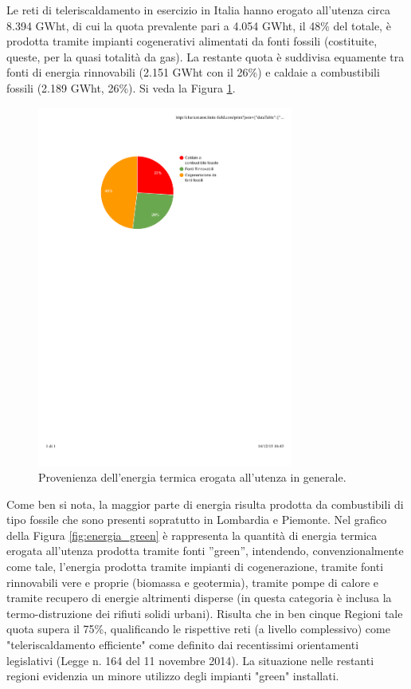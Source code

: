 \documentclass[laurea,oneside,11pt]{USiena_tesiLM}
\begin{document}
Le reti di teleriscaldamento in esercizio in Italia hanno erogato all'utenza circa 8.394 GWht, di cui la quota prevalente pari a 4.054 GWht, il 48\% del totale, è prodotta tramite impianti cogenerativi alimentati da fonti fossili (costituite, queste, per la quasi totalità da gas). La restante quota è suddivisa equamente tra fonti di energia rinnovabili (2.151 GWht con il 26\%) e caldaie a combustibili fossili (2.189 GWht, 26\%). Si veda la Figura \ref{fig:torta}.

\begin{figure}[!ht]
\centering
\includegraphics[width=0.75\textwidth]{figure/torta_energia} 
\caption{Provenienza dell'energia termica erogata all'utenza in generale.}
\label{fig:torta}
\end{figure}

Come ben si nota, la maggior parte di energia risulta prodotta da combustibili di tipo fossile che sono presenti sopratutto in Lombardia e Piemonte.
Nel grafico della Figura \ref{fig:energia_green} è rappresenta la quantità di energia termica erogata all'utenza prodotta tramite fonti ''green'', intendendo, convenzionalmente come tale, l'energia prodotta tramite impianti di cogenerazione, tramite fonti rinnovabili vere e proprie (biomassa e geotermia), tramite pompe di calore e tramite recupero di energie altrimenti disperse (in questa categoria è inclusa la termo-distruzione dei rifiuti solidi urbani).
Risulta che in ben cinque Regioni tale quota supera il 75\%, qualificando le rispettive reti (a livello complessivo) come "teleriscaldamento efficiente" come definito dai recentissimi orientamenti legislativi (Legge n. 164 del 11 novembre 2014).
La situazione nelle restanti regioni evidenzia un minore utilizzo degli impianti "green" installati.
\end{document}
